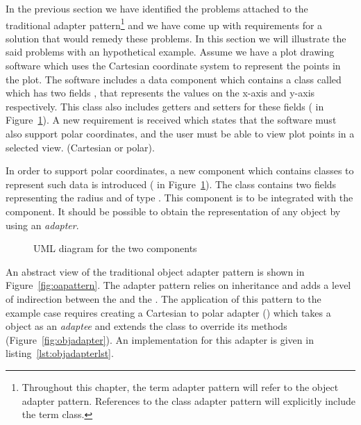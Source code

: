 In the previous section we have identified the problems attached to the traditional adapter pattern\footnote{Throughout this chapter, the term adapter pattern will refer to the object adapter pattern. References to the class adapter pattern will explicitly include the term class.} and we have come up with requirements for a solution that would remedy these problems. In this section we will illustrate the said problems with an hypothetical example.
Assume we have a plot drawing software which uses the Cartesian coordinate system to represent the points in the plot. 
The software includes a data component which contains a class called  which has two fields , that represents the values on the x-axis and y-axis respectively. 
This class also includes getters and setters for these fields ( in Figure~\ref{fig:components}).
A new requirement is received which states that the software must also support polar coordinates, and the user must be able to view plot points in a selected view. (Cartesian or polar). 

In order to support polar coordinates, a new component which contains classes to represent such data is introduced ( in Figure~\ref{fig:components}). The class  contains two fields  representing the radius and  of type . This component is to be integrated with the  component. It should be possible to obtain the  representation of any  object by using an \emph{adapter}.

\begin{figure}
\centering

\label{fig:components}
\caption{UML diagram for the two components}
\end{figure}

An abstract view of the traditional object adapter pattern is shown in Figure~\ref{fig:oapattern}. The adapter pattern relies on inheritance and adds a level of indirection between the  and the . The application of this pattern to the example case requires creating a Cartesian to polar adapter () which takes a  object as an \emph{adaptee} and extends the  class to override its methods (Figure~\ref{fig:objadapter}). An implementation for this adapter is given in listing~\ref{lst:objadapterlst}.


